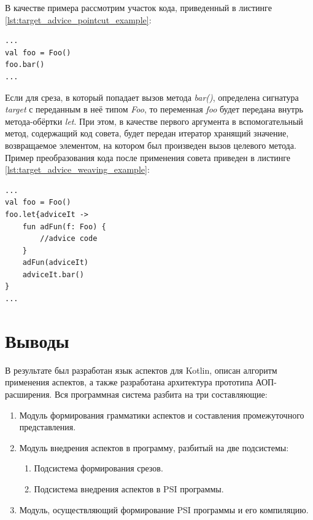 В качестве примера рассмотрим участок кода, приведенный в листинге
\ref{lst:target_advice_pointcut_example}:
\begin{lstlisting}[style={java}, label=lst:target_advice_pointcut_example,
    caption={Пример точки внедрения}]
...
val foo = Foo()
foo.bar()
...
\end{lstlisting}
Если для среза, в который попадает вызов метода \textit{bar()}, определена
сигнатура \textit{target} с переданным в неё типом \textit{Foo}, то переменная
\textit{foo} будет передана внутрь метода-обёртки \textit{let}.
При этом, в качестве первого аргумента в вспомогательный метод, содержащий код совета, будет передан итератор хранящий значение, возвращаемое элементом, на котором был произведен вызов целевого метода.
Пример преобразования кода после применения совета приведен в листинге
\ref{lst:target_advice_weaving_example}:
\begin{lstlisting}[style={java}, label=lst:target_advice_weaving_example,
    caption={Пример применения совета, имеющего сигнатуру \textit{target}}]
...
val foo = Foo()
foo.let{adviceIt ->
	fun adFun(f: Foo) {
		//advice code
	}
	adFun(adviceIt)
	adviceIt.bar()
}
...
\end{lstlisting}

\section{Выводы}
\label{sec:design_conclusion}
В результате был разработан язык аспектов для Kotlin,
описан алгоритм применения аспектов, а также разработана архитектура прототипа АОП-расширения.
Вся программная система разбита на три составляющие:
\begin{enumerate}
	\item Модуль формирования грамматики аспектов и составления промежуточного представления.
	\item Модуль внедрения аспектов в программу, разбитый на две подсистемы:
	\begin{enumerate}
		\item Подсистема формирования срезов.
		\item Подсистема внедрения аспектов в PSI программы.
	\end{enumerate}
	\item Модуль, осуществляющий формирование PSI программы и его компиляцию.
\end{enumerate}
